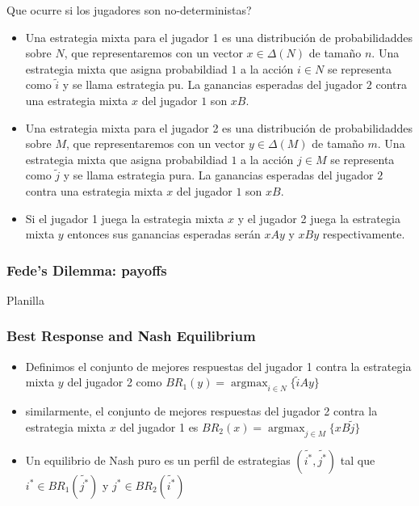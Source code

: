 \documentclass[pdf]{beamer}
\newcommand{\pstrat}{\widetilde}
\DeclareMathOperator*{\argmax}{argmax}
\begin{document}
\begin{frame}
    Que ocurre si los jugadores son no-deterministas?
    \begin{itemize}
        \item Una estrategia mixta para el jugador 1 es una distribución de probabilidaddes sobre $N$, que representaremos con un vector $x \in \Delta(N)$ de tamaño $n$. Una estrategia mixta que asigna probabildiad $1$ a la acción $i \in N$ se representa como $\pstrat{i}$ y se llama estrategia pu. La ganancias esperadas del jugador $2$ contra una estrategia mixta $x$ del jugador $1$ son $xB$.
        \pause
        \item Una estrategia mixta para el jugador 2 es una distribución de probabilidaddes sobre $M$, que representaremos con un vector $y \in \Delta(M)$ de tamaño $m$. Una estrategia mixta que asigna probabildiad $1$ a la acción $j \in M$ se representa como $\pstrat{j}$ y se llama estrategia pura. La ganancias esperadas del jugador $2$ contra una estrategia mixta $x$ del jugador $1$ son $xB$.
        \pause
        \item Si el jugador 1 juega la estrategia mixta $x$ y el jugador 2 juega la estrategia mixta $y$ entonces sus ganancias esperadas serán $xAy$ y $xBy$ respectivamente. 
    \end{itemize}
\end{frame}

\begin{frame}
    \frametitle{Fede's Dilemma: payoffs}
    
    Planilla


\end{frame}

\begin{frame}
    \frametitle{Best Response and Nash Equilibrium}

    \begin{itemize}
        \item Definimos el conjunto de mejores respuestas del jugador 1 contra la estrategia mixta $y$ del jugador 2 como $BR_1(y) = \argmax_{i \in N}\{ \pstrat{i}Ay\}$
        \pause
        \item similarmente, el conjunto de mejores respuestas del jugador 2 contra la estrategia mixta $x$ del jugador 1 es $BR_2(x) = \argmax_{j \in M}\{ xB\pstrat{j}\}$
        \pause
        \item Un equilibrio de Nash puro es un perfil de estrategias $(\pstrat{i^*}, \pstrat{j^*})$ tal que $i^* \in BR_1(\pstrat{j^*})$ y $j^* \in BR_2(\pstrat{i^*})$
    \end{itemize}
\end{frame}
\end{document}
